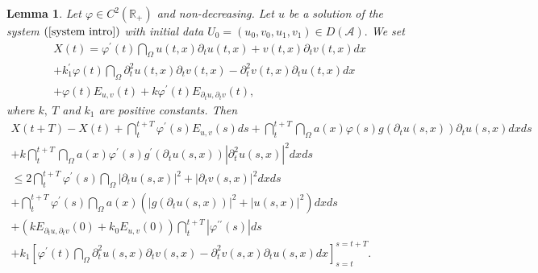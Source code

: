 \documentclass[11pt,reqno]{amsart}
\theoremstyle{plain}
\newtheorem{lemma}{Lemma}
\numberwithin{equation}{section}
\numberwithin{equation}{section}
\begin{document}
\begin{lemma}
\label{lemma Xt}Let $\varphi \in C^{2}\left( 
\mathbb{R}
_{+}\right) $ and non-decreasing. Let $u$ be a solution of the system $%
\left( \ref{system intro}\right) $ with initial data $U_{0}=\left(
u_{0},v_{0},u_{1},v_{1}\right) \in D\left( \mathcal{A}\right) .$ We set%
\begin{equation}
\begin{array}{l}
X\left( t\right) =\varphi ^{\prime }\left( t\right) \dint_{\Omega }u\left(
t,x\right) \partial _{t}u\left( t,x\right) +v\left( t,x\right) \partial
_{t}v\left( t,x\right) dx \\ 
+k_{1}^{\prime }\varphi \left( t\right) \dint_{\Omega }\partial
_{t}^{2}u\left( t,x\right) \partial _{t}v\left( t,x\right) -\partial
_{t}^{2}v\left( t,x\right) \partial _{t}u\left( t,x\right) dx \\ 
+\varphi \left( t\right) E_{u,v}\left( t\right) +k\varphi ^{\prime }\left(
t\right) E_{\partial _{t}u,\partial _{t}v}\left( t\right) ,%
\end{array}
\label{Xt definition}
\end{equation}%
where $k,~T$ and $k_{1}$ are positive constants. Then%
\begin{equation}
\begin{array}{l}
X\left( t+T\right) -X\left( t\right) +\dint_{t}^{t+T}\varphi ^{\prime
}\left( s\right) E_{u,v}\left( s\right) ds+\dint_{t}^{t+T}\dint_{\Omega
}a\left( x\right) \varphi \left( s\right) g\left( \partial _{t}u\left(
s,x\right) \right) \partial _{t}u\left( s,x\right) dxds \\ 
+k\dint_{t}^{t+T}\dint_{\Omega }a\left( x\right) \varphi ^{\prime }\left(
s\right) g^{\prime }\left( \partial _{t}u\left( s,x\right) \right)
\left\vert \partial _{t}^{2}u\left( s,x\right) \right\vert ^{2}dxds \\ 
\leq 2\dint_{t}^{t+T}\varphi ^{\prime }\left( s\right) \dint_{\Omega
}\left\vert \partial _{t}u\left( s,x\right) \right\vert ^{2}+\left\vert
\partial _{t}v\left( s,x\right) \right\vert ^{2}dxds \\ 
+\dint_{t}^{t+T}\varphi ^{\prime }\left( s\right) \dint_{\Omega }a\left(
x\right) \left( \left\vert g\left( \partial _{t}u\left( s,x\right) \right)
\right\vert ^{2}+\left\vert u\left( s,x\right) \right\vert ^{2}\right) dxds
\\ 
+\left( kE_{\partial _{t}u,\partial _{t}v}\left( 0\right)
+k_{0}E_{u,v}\left( 0\right) \right) \dint_{t}^{t+T}\left\vert \varphi
^{\prime \prime }\left( s\right) \right\vert ds \\ 
+k_{1}\left[ \varphi ^{\prime }\left( t\right) \dint_{\Omega }\partial
_{t}^{2}u\left( s,x\right) \partial _{t}v\left( s,x\right) -\partial
_{t}^{2}v\left( s,x\right) \partial _{t}u\left( s,x\right) dx\right]
_{s=t}^{s=t+T}.%
\end{array}
\label{Xt estimate}
\end{equation}
\end{lemma}
\end{document}
